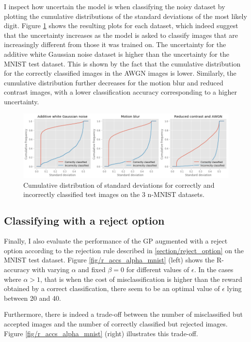 \documentclass{article}
\begin{document}
I inspect how uncertain the model is when classifying the noisy dataset by plotting the cumulative distributions of the standard deviations of the most likely digit. Figure \ref{fig/noisy_mnist_cum_stds} shows the resulting plots for each dataset, which indeed suggest that the uncertainty increases as the model is asked to classify images that are increasingly different from those it was trained on. The uncertainty for the additive white Gaussian noise dataset is higher than the uncertainty for the MNIST test dataset. This is shown by the fact that the cumulative distribution for the correctly classified images in the AWGN images is lower. Similarly, the cumulative distribution further decreases for the motion blur and reduced contrast images, with a lower classification accuracy corresponding to a higher uncertainty.

\begin{figure}
	\centering
	\includegraphics[scale=0.35]{noisy_mnist_cum_stds}
	\caption{Cumulative distribution of standard deviations for correctly and incorrectly classified test images on the 3 n-MNIST datasets.}
	\label{fig/noisy_mnist_cum_stds}
\end{figure}

\subsection{Classifying with a reject option}
Finally, I also evaluate the performance of the GP augmented with a reject option according to the rejection rule described in \ref{section/reject_option} on the MNIST test dataset. Figure \ref{fig/r_accs_alpha_mnist} (left) shows the R-accuracy with varying $\alpha$ and fixed $\beta=0$ for different values of $\epsilon$. In the cases where $\alpha > 1$, that is when the cost of misclassification is higher than the reward obtained by a correct classification, there seem to be an optimal value of $\epsilon$ lying between 20 and 40. 

Furthermore, there is indeed a trade-off between the number of misclassified but accepted images and the number of correctly classified but rejected images. Figure \ref{fig/r_accs_alpha_mnist} (right) illustrates this trade-off.
\end{document}
